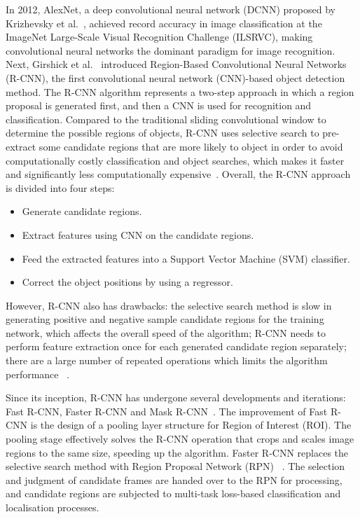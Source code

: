 In 2012, AlexNet, a deep convolutional neural network (DCNN) proposed by Krizhevsky et al.~\cite{krizhevsky2012imagenet}, achieved record accuracy in image classification at the ImageNet Large-Scale Visual Recognition Challenge (ILSRVC), making convolutional neural networks the dominant paradigm for image recognition. Next, Girshick et al.~\cite{girshick2014rich} introduced Region-Based Convolutional Neural Networks (R-CNN), the first convolutional neural network (CNN)-based object detection method. The R-CNN algorithm represents a two-step approach in which a region proposal is generated first, and then a CNN is used for recognition and classification. Compared to the traditional sliding convolutional window to determine the possible regions of objects, R-CNN uses selective search to pre-extract some candidate regions that are more likely to object in order to avoid computationally costly classification and object searches, which makes it faster and significantly less computationally expensive~\cite{ uijlings2013selective, girshick2014rich}. Overall, the R-CNN approach is divided into four steps:

\begin{itemize}
    \item Generate candidate regions.
    \item Extract features using CNN on the candidate regions.
    \item Feed the extracted features into a Support Vector Machine (SVM) classifier.
    \item Correct the object positions by using a regressor.
\end{itemize}

However, R-CNN also has drawbacks: the selective search method is slow in generating positive and negative sample candidate regions for the training network, which affects the overall speed of the algorithm; R-CNN needs to perform feature extraction once for each generated candidate region separately; there are a large number of repeated operations which limits the algorithm performance ~\cite{huang2017speed}.

Since its inception, R-CNN has undergone several developments and iterations: Fast R-CNN, Faster R-CNN and Mask R-CNN~\cite{girshick2015fast, ren2015faster, he2017mask}. The improvement of Fast R-CNN is the design of a pooling layer structure for Region of Interest (ROI). The pooling stage effectively solves the R-CNN operation that crops and scales image regions to the same size, speeding up the algorithm. Faster R-CNN replaces the selective search method with Region Proposal Network (RPN) ~\cite{ren2015faster}. The selection and judgment of candidate frames are handed over to the RPN for processing, and candidate regions are subjected to multi-task loss-based classification and localisation processes. 

